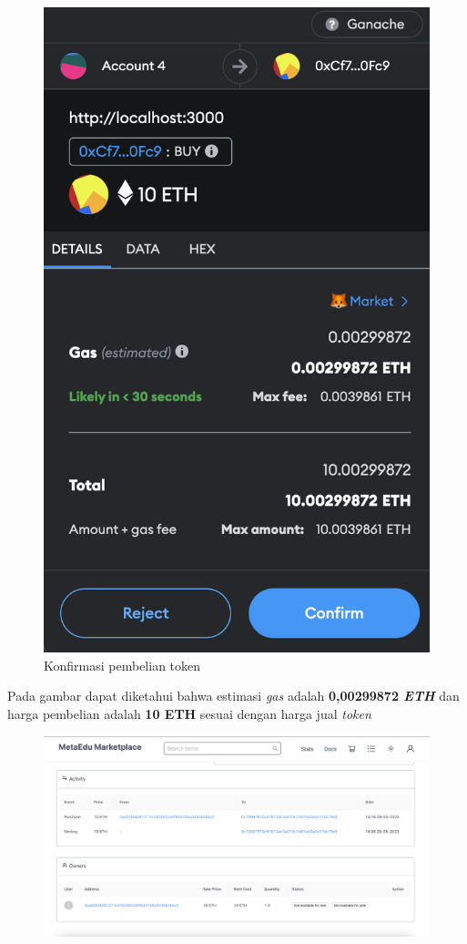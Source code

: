 \begin{itemize}
\begin{figure} [H]
        \includegraphics[scale=0.4]{gambar/img-test-buy-buy-1.png}
        \caption{Konfirmasi pembelian token}
        \label{fig:TestBuyKonfirmasiPembelianToken}
      \end{figure}
    Pada gambar dapat diketahui bahwa estimasi \emph{gas} adalah \textbf{0,00299872 \emph{ETH}} dan harga pembelian adalah \textbf{10 ETH} sesuai dengan harga jual \emph{token}
    \begin{figure} [H] \centering
        \includegraphics[scale=0.3]{gambar/img-test-buy-buy-2.png}

\end{figure}
\end{itemize}

